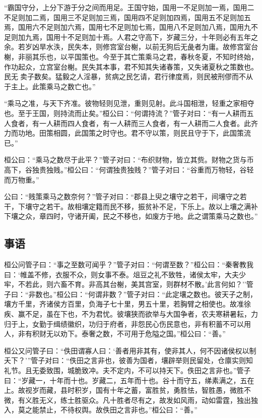 \documentclass[]{article}
\begin{document}
``霸国守分，上分下游于分之间而用足。王国守始，国用一不足则加一焉，国用二不足则加二焉，国用三不足则加三焉，国用四不足则加四焉，国用五不足则加五焉，国用六不足则加六焉，国用七不足则加七焉，国用八不足则加八焉，国用九不足则加九焉，国用十不足则加十焉。人君之守高下，岁藏三分，十年则必有五年之余。若岁凶旱水泆，民失本，则修宫室台榭，以前无狗后无彘者为庸。故修宫室台榭，非丽其乐也，以平国策也。今至于其亡策乘马之君，春秋冬夏，不知时终始，作功起众，立宫室台榭。民失其本事，君不知其失诸春策，又失诸夏秋之策数也。民无卖子数矣。猛毅之人淫暴，贫病之民乞请，君行律度焉，则民被刑僇而不从于主上。此策乘马之数亡也。''

``乘马之准，与天下齐准。彼物轻则见泄，重则见射。此斗国相泄，轻重之家相夺也。至于王国，则持流而止矣。''桓公曰：``何谓持流？''管子对曰：``有一人耕而五人食者，有一人耕而四人食者，有一人耕而三人食者，有一人耕而二人食者。此齐力而功地。田策相圆，此国策之时守也。君不守以策，则民且守于下，此国策流已。''

桓公曰：``乘马之数尽于此平？''管子对曰：``布织财物，皆立其赀。财物之货与币高下，谷独贵独贱。''桓公曰：``何谓独贵独贱？''管子对曰：``谷重而万物轻，谷轻而万物重。''

公曰：``贱策乘马之数奈何？''管子对曰：``郡县上臾之壤守之若干，间壤守之若干，下壤守之若干。故相壤定籍而民不移，振贫补不足，下乐上。故以上壤之满补下壤之众，章四时，守诸开阖，民之不移也，如废方于地。此之谓策乘马之数也。''

\hypertarget{header-n961}{%
\subsection{事语}\label{header-n961}}

桓公问管子曰：``事之至数可闻乎？''管子对曰：``何谓至数？''桓公曰：``秦奢教我曰：`帷盖不修，衣服不众，则女事不泰。俎豆之礼不致牲，诸侯太牢，大夫少牢，不若此，则六畜不育。非高其台榭，美其宫室，则群材不散。'此言何如？''管子曰：``非数也。''桓公曰：``何谓非数？''管子对曰：``此定壤之数也。彼天子之制，壤方千里，齐诸侯方百里，负海子七十里，男五十里，若胸臂之相使也。故准徐疾、赢不足，虽在下也，不为君忧。彼壤狭而欲举与大国争者，农夫寒耕暑耘，力归于上，女勤于缉绩徽织，功归于府者，非怨民心伤民意也，非有积蓄不可以用人，非有积财无以劝下。泰奢之数，不可用于危隘之国。''桓公曰：``善。''

桓公又问管子曰：``佚田谓寡人曰：`善者用非其有，使非其人，何不因诸侯权以制夭下？'''管子对曰：``佚田之言非也，彼善为国者，壤辟举则民留处，仓廪实则知礼节。且无委致围，城脆致冲。夫不定内，不可以持天下。佚田之言非也。''管子曰：``岁藏一，十年而十也。岁藏二，五年而十也。谷十而守五，绨素满之，五在上。故视岁而藏，县时积岁，国有十年之蓄，富胜贫，勇胜怯，智胜愚，微胜不微，有义胜无义，练士胜驱众。凡十胜者尽有之，故发如风雨，动如雷霆，独出独入，莫之能禁止，不待权舆。故佚田之言非也。''桓公曰：``善。''
\end{document}

